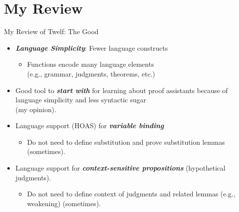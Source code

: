 \documentclass{beamer}
\renewcommand{\emph}[1]{\textbf{\textit{#1}}}
\begin{document}
\section{My Review}

\begin{frame}{My Review of Twelf:  The Good}
\begin{itemize}
\item \emph{Language Simplicity}: Fewer language constructs
	\begin{itemize}
	\item Functions encode many language elements \\
	(e.g., grammar, judgments, theorems, etc.)
	\end{itemize}

\item Good tool to \emph{start with} for learning
about proof assistants because of language simplicity and
less syntactic sugar \\
(my opinion).

\pause
\item Language support (HOAS) for \emph{variable binding}
	\begin{itemize}
	\item Do not need to define substitution
	and prove substitution lemmas (sometimes).
	\end{itemize}

\item Language support for \emph{context-sensitive propositions}
(hypothetical judgments).
	\begin{itemize}
	\item Do not need to define context of judgments
	and related lemmas (e.g., weakening) (sometimes).
	\end{itemize}
\end{itemize}
\end{frame}
\end{document}
